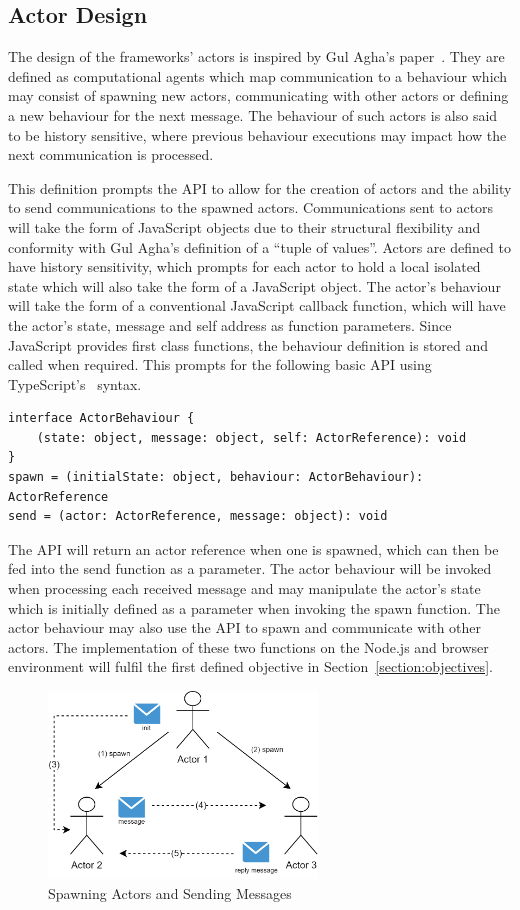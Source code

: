 \documentclass[oneside]{um-fict}
\begin{document}
\subsection{Actor Design}
The design of the frameworks' actors is inspired by Gul Agha's paper~\cite{agha1985actors}. They are defined as computational agents which map communication to a behaviour which may consist of spawning new actors, communicating with other actors or defining a new behaviour for the next message. The behaviour of such actors is also said to be history sensitive, where previous behaviour executions may impact how the next communication is processed.

This definition prompts the API to allow for the creation of actors and the ability to send communications to the spawned actors. Communications sent to actors will take the form of JavaScript objects due to their structural flexibility and conformity with Gul Agha's definition of a “tuple of values”. Actors are defined to have history sensitivity, which prompts for each actor to hold a local isolated state which will also take the form of a JavaScript object. The actor's behaviour will take the form of a conventional JavaScript callback function, which will have the actor's state, message and self address as function parameters. Since JavaScript provides first class functions, the behaviour definition is stored and called when required. This prompts for the following basic API using TypeScript's~\cite{typescript} syntax.
\begin{lstlisting}
interface ActorBehaviour {
    (state: object, message: object, self: ActorReference): void
}
spawn = (initialState: object, behaviour: ActorBehaviour): ActorReference
send = (actor: ActorReference, message: object): void    
\end{lstlisting}
The API will return an actor reference when one is spawned, which can then be fed into the send function as a parameter. The actor behaviour will be invoked when processing each received message and may manipulate the actor's state which is initially defined as a parameter when invoking the spawn function. The actor behaviour may also use the API to spawn and communicate with other actors. The implementation of these two functions on the Node.js and browser environment will fulfil the first defined objective in Section~\ref{section:objectives}. 
\begin{figure}[H]
    \begin{centering}
        \includegraphics[width=270px]{resources/actors.png}
        \caption{Spawning Actors and Sending Messages}\label{fig:actors}
    \end{centering}
\end{figure}
\end{document}
